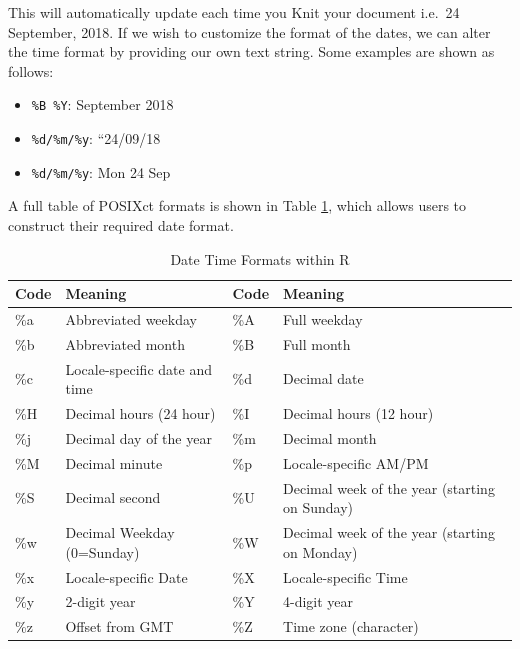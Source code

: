 \documentclass[]{book}
\newenvironment{Shaded}{\begin{snugshade}}{\end{snugshade}}
\newcommand{\OtherTok}[1]{\textcolor[rgb]{0.56,0.35,0.01}{#1}}
\newcommand{\FunctionTok}[1]{\textcolor[rgb]{0.00,0.00,0.00}{#1}}
\newcommand{\AttributeTok}[1]{\textcolor[rgb]{0.77,0.63,0.00}{#1}}
\providecommand{\tightlist}{%
  \setlength{\itemsep}{0pt}\setlength{\parskip}{0pt}}
\begin{document}
\begin{Shaded}
\end{Shaded}

This will automatically update each time you Knit your document i.e.~24
September, 2018. If we wish to customize the format of the dates, we can
alter the time format by providing our own text string. Some examples
are shown as follows:

\begin{itemize}
\tightlist
\item
  \texttt{\%B\ \%Y}: September 2018
\item
  \texttt{\%d/\%m/\%y}: ``24/09/18
\item
  \texttt{\%d/\%m/\%y}: Mon 24 Sep
\end{itemize}

A full table of POSIXct formats is shown in Table
\ref{tab:dateTimeFormats}, which allows users to construct their
required date format.

\begin{table}

\caption{\label{tab:dateTimeFormats}Date Time Formats within R}
\centering
\begin{tabular}[t]{l|l|l|l}
\hline
Code & Meaning & Code & Meaning\\
\hline
\%a & Abbreviated weekday & \%A & Full weekday\\
\hline
\%b & Abbreviated month & \%B & Full month\\
\hline
\%c & Locale-specific date and time & \%d & Decimal date\\
\hline
\%H & Decimal hours (24 hour) & \%I & Decimal hours (12 hour)\\
\hline
\%j & Decimal day of the year & \%m & Decimal month\\
\hline
\%M & Decimal minute & \%p & Locale-specific AM/PM\\
\hline
\%S & Decimal second & \%U & Decimal week of the year (starting on Sunday)\\
\hline
\%w & Decimal Weekday (0=Sunday) & \%W & Decimal week of the year (starting on Monday)\\
\hline
\%x & Locale-specific Date & \%X & Locale-specific Time\\
\hline
\%y & 2-digit year & \%Y & 4-digit year\\
\hline
\%z & Offset from GMT & \%Z & Time zone (character)\\
\hline
\end{tabular}
\end{table}
\end{document}
